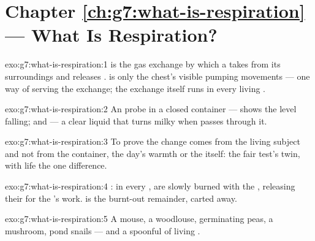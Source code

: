 \section*{Chapter \ref{ch:g7:what-is-respiration} --- What Is Respiration?}

\begin{solution}{exo:g7:what-is-respiration:1}
 is the gas exchange by which a  takes
 from its surroundings and releases .
 is only the chest's visible pumping movements ---
one way of serving the exchange; the exchange itself runs in
every living .
\end{solution}

\begin{solution}{exo:g7:what-is-respiration:2}
An  probe in a closed container --- shows the 
level falling; and  --- a clear liquid that turns
milky when  passes through it.
\end{solution}

\begin{solution}{exo:g7:what-is-respiration:3}
To prove the change comes from the living subject and not
from the container, the day's warmth or the 
itself: the fair test's twin, with life the one difference.
\end{solution}

\begin{solution}{exo:g7:what-is-respiration:4}
: in every ,  are slowly burned with the
, releasing their  for the 's work.  is the burnt-out remainder, carted away.
\end{solution}

\begin{solution}{exo:g7:what-is-respiration:5}
A mouse, a woodlouse, germinating peas, a mushroom, pond
snails --- and a spoonful of living .
\end{solution}

